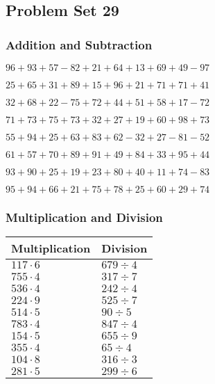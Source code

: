 \hypertarget{problem-set-29}{%
\subsection{Problem Set 29}\label{problem-set-29}}

\hypertarget{addition-and-subtraction}{%
\subsubsection{Addition and
Subtraction}\label{addition-and-subtraction}}

\(96+93+57-82+21+64+13+69+49-97\)

\(25+65+31+89+15+96+21+71+71+41\)

\(32+68+22-75+72+44+51+58+17-72\)

\(71+73+75+73+32+27+19+60+98+73\)

\(55+94+25+63+83+62-32+27-81-52\)

\(61+57+70+89+91+49+84+33+95+44\)

\(93+90+25+19+23+80+40+11+74-83\)

\(95+94+66+21+75+78+25+60+29+74\)

\hypertarget{multiplication-and-division}{%
\subsubsection{Multiplication and
Division}\label{multiplication-and-division}}

\begin{longtable}[]{@{}ll@{}}
\toprule
Multiplication & Division\tabularnewline
\midrule
\endhead
\(117\cdot6\) & \(679÷4\)\tabularnewline
\(755\cdot4\) & \(317÷7\)\tabularnewline
\(536\cdot4\) & \(242÷4\)\tabularnewline
\(224\cdot9\) & \(525÷7\)\tabularnewline
\(514\cdot5\) & \(90÷5\)\tabularnewline
\(783\cdot4\) & \(847÷4\)\tabularnewline
\(154\cdot5\) & \(655÷9\)\tabularnewline
\(355\cdot4\) & \(65÷4\)\tabularnewline
\(104\cdot8\) & \(316÷3\)\tabularnewline
\(281\cdot5\) & \(299÷6\)\tabularnewline
\bottomrule
\end{longtable}
